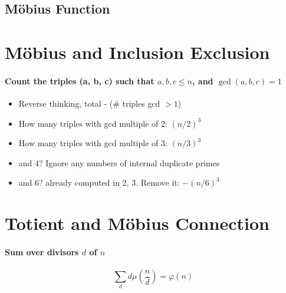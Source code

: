        \subsection{Möbius Function}

        \section*{Möbius and Inclusion Exclusion}

        \paragraph{Count the triples (a, b, c) such that \(a, b, c \leq n\), and
            \(\gcd(a, b, c) = 1\)}
        \begin{itemize}
            \item Reverse thinking, total - (\# triples gcd \(> 1\))
            \item How many triples with gcd multiple of 2: \((n/2)^3\)
            \item How many triples with gcd multiple of 3: \((n/3)^3\)
            \item and 4? Ignore any numbers of internal duplicate primes
            \item and 6? already computed in 2, 3. Remove it:  \(-(n/6)^3\)
        \end{itemize}


        \section*{Totient and Möbius Connection}

        \paragraph{Sum over divisors \(d\) of \(n\)}
        \[
        \sum_d d \mu \left( \frac{n}{d} \right) = \varphi(n)
        \]